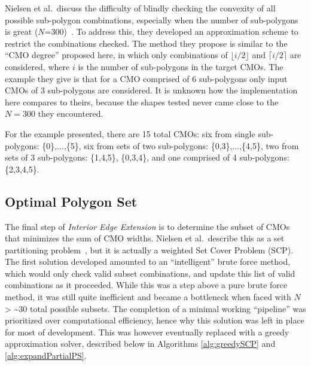 Nielsen et al.\ discuss the difficulty of blindly checking the convexity of all possible sub-polygon combinations, especially when the number of sub-polygons is great ($N$=300)~\cite{IntEdgeExt}.
To address this, they developed an approximation scheme to restrict the combinations checked.
The method they propose is similar to the ``CMO degree'' proposed here, in which only combinations of $\lfloor i/2 \rfloor$ and $\lceil i/2 \rceil$ are considered, where $i$ is the number of sub-polygons in the target CMOs.
The example they give is that for a CMO comprised of 6 sub-polygons only input CMOs of 3 sub-polygons are considered.
It is unknown how the implementation here compares to theirs, because the shapes tested never came close to the $N=300$ they encountered.

For the example presented, there are 15 total CMOs: six from single sub-polygons: \{0\},...,\{5\}, six from sets of two sub-polygons: \{0,3\},...,\{4,5\}, two from sets of 3 sub-polygons: \{1,4,5\}, \{0,3,4\}, and one comprised of 4 sub-polygons: \{2,3,4,5\}.

\subsection{Optimal Polygon Set}%
The final step of \textit{Interior Edge Extension} is to determine the subset of CMOs that minimizes the sum of CMO widths.
Nielsen et al.\ describe this as a set partitioning problem~\cite{IntEdgeExt}, but it is actually a weighted Set Cover Problem (SCP).
The first solution developed amounted to an ``intelligent'' brute force method, which would only check valid subset combinations, and update this list of valid combinations as it proceeded.
While this was a step above a pure brute force method, it was still quite inefficient and became a bottleneck when faced with $N$ > \textasciitilde 30 total possible subsets.
The completion of a minimal working ``pipeline'' was prioritized over computational efficiency, hence why this solution was left in place for most of development.
This was however eventually replaced with a greedy approximation solver, described below in Algorithms \ref{alg:greedySCP} and \ref{alg:expandPartialPS}.


